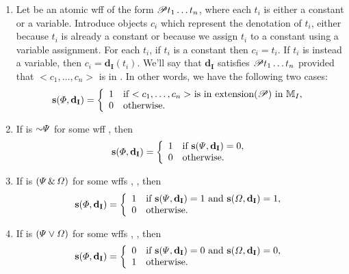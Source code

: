 \begin{enumerate}
\item Let \metaA{} be an atomic wff of the form $\mathscr{P}t_1\ldots t_n$, where each $t_i$ is either a constant or a variable. Introduce objects $c_i$ which represent the denotation of $t_i$, either because $t_i$ is already a constant or because we assign $t_i$ to a constant using a variable assignment. For each $t_i$, if $t_i$ is a constant then $c_i = t_i$. If $t_i$ is instead a variable, then $c_i = \mathbf{d_I}(t_i)$. We'll say that $\mathbf{d_I}$ satisfies $\mathscr{P}t_1\ldots t_n$ provided that $< c_1, \ldots, c_n>$ is in . In other words, we have the following two cases:
\begin{displaymath}\mathbf{s}(\varPhi{}, \mathbf{d_I}) =
	\left\{\begin{array}{ll}
	1 & \mbox{if $< c_1, \ldots, c_n>$ is in \ensuremath{\mbox{extension}(\mathscr{P})} in $\mathbb{M}_I$},\\
	0 & \mbox{otherwise.}
	\end{array}\right.
\end{displaymath}


\item If \metaA{} is ${\enot}\metaB{}$ for some wff \metaB{}, then
\begin{displaymath}\mathbf{s}(\varPhi{}, \mathbf{d_I}) =
	\left\{\begin{array}{ll}
	1 & \mbox{if $\mathbf{s}(\varPsi{}, \mathbf{d_I}) = 0$},\\
	0 & \mbox{otherwise.}
	\end{array}\right.
\end{displaymath}

\item If \metaA{} is $(\varPsi{}\,\&\,\varOmega{})$ for some wffs \metaA{}, \metaB{}, then
\begin{displaymath}\mathbf{s}(\varPhi{}, \mathbf{d_I}) =
	\left\{\begin{array}{ll}
	1 & \mbox{if $\mathbf{s}(\varPsi{}, \mathbf{d_I}) = 1$ and $\mathbf{s}(\varOmega{}, \mathbf{d_I}) = 1$,}\\
	0 & \mbox{otherwise.}
	\end{array}\right.
\end{displaymath}

\item If \metaA{} is $(\varPsi{}\vee\varOmega{})$ for some wffs \metaA{}, \metaB{}, then
\begin{displaymath}\mathbf{s}(\varPhi{}, \mathbf{d_I}) =
	\left\{\begin{array}{ll}
	0 & \mbox{if $\mathbf{s}(\varPsi{}, \mathbf{d_I}) = 0$  and $\mathbf{s}(\varOmega{}, \mathbf{d_I}) = 0$,}\\
	1 & \mbox{otherwise.}
	\end{array}\right.
\end{displaymath}


\end{enumerate}
